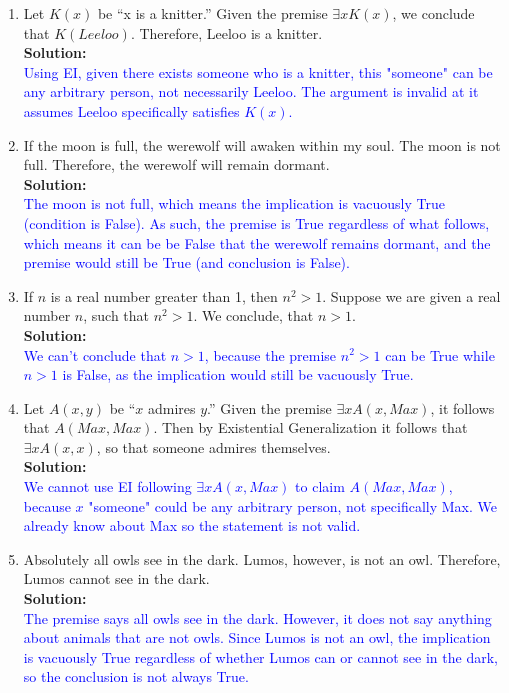 \documentclass{article}
\newcommand{\sol}[1]{\textbf{Solution:\,}\textcolor{blue}{#1}}
\begin{document}
\begin{enumerate}
\begin{enumerate}
\item Let $K(x)$ be ``x is a knitter.'' Given the premise $\exists x K(x)$, we conclude that $K(Leeloo)$. Therefore, Leeloo is a knitter.
\\\sol{
\\Using EI, given there exists someone who is a knitter, this "someone" can be any arbitrary person, not necessarily Leeloo. The argument is invalid at it assumes Leeloo specifically satisfies $K(x)$.
}
\item If the moon is full, the werewolf will awaken within my soul. The moon is not full. Therefore, the werewolf will remain dormant.
\\\sol{
\\The moon is not full, which means the implication is vacuously True (condition is False). As such, the premise is True regardless of what follows, which means it can be be False that the werewolf remains dormant, and the premise would still be True (and conclusion is False).
}   
\item If $n$ is a real number greater than 1, then $n^2>1$. Suppose we are given a real number $n$, such that $n^2 >1$. We conclude, that $n>1$.
\\\sol{
\\We can't conclude that $n>1$, because the premise $n^2 >1$ can be True while $n>1$ is False, as the implication would still be vacuously True.
}
\item Let $A(x, y)$ be ``$x$ admires $y$.'' Given the premise $\exists x A(x, Max)$, it follows that $A(Max, Max)$. Then by Existential Generalization it follows that $\exists x A(x, x)$, so that someone admires themselves.
\\\sol{
\\We cannot use EI following $\exists x A(x, Max)$ to claim $A(Max, Max)$, because $x$ "someone" could be any arbitrary person, not specifically Max. We already know about Max so the statement is not valid.
}
\item Absolutely all owls see in the dark. Lumos, however, is not an owl.
Therefore, Lumos cannot see in the dark.
\\\sol{
\\The premise says all owls see in the dark. However, it does not say anything about animals that are not owls. Since Lumos is not an owl, the implication is vacuously True regardless of whether Lumos can or cannot see in the dark, so the conclusion is not always True.
}
\end{enumerate}


\end{enumerate}
\end{document}
